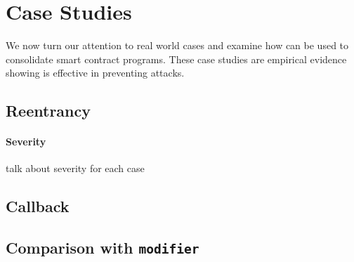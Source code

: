 \section{Case Studies} \label{sec:case}

We now turn our attention to real world cases and examine how \lang
can be used to consolidate smart contract programs.
These case studies are empirical evidence showing \lang is effective
in preventing attacks.

\subsection{Reentrancy}

\paragraph{Severity} talk about severity for each case

\subsection{Callback}

\subsection{Comparison with \texttt{modifier}}


